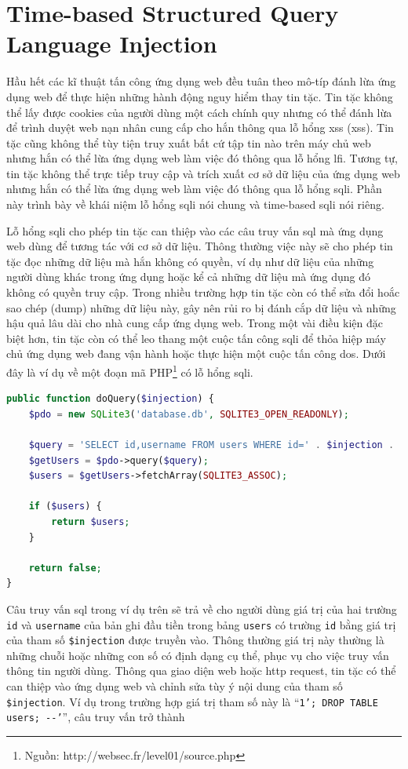 \section{Time-based Structured Query Language Injection}
Hầu hết các kĩ thuật tấn công ứng dụng web đều tuân theo mô-típ đánh lừa ứng dụng web để thực hiện những hành động nguy hiểm thay tin tặc. Tin tặc không thể lấy được cookies của người dùng một cách chính quy nhưng có thể đánh lừa để trình duyệt web nạn nhân cung cấp cho hắn thông qua lỗ hổng \acrlong{xss} (\acrshort{xss}). Tin tặc cũng không thể tùy tiện truy xuất bất cứ tập tin nào trên máy chủ web nhưng hắn có thể lừa ứng dụng web làm việc đó thông qua lỗ hổng \acrshort{lfi}. Tương tự, tin tặc không thể trực tiếp truy cập và trích xuất cơ sở dữ liệu của ứng dụng web nhưng hắn có thể lừa ứng dụng web làm việc đó thông qua lỗ hổng \acrfull{sqli}. Phần này trình bày về khái niệm lỗ hổng \acrshort{sqli} nói chung và time-based \acrshort{sqli} nói riêng.\par
Lỗ hổng \acrfull{sqli} \parencite{li2011survey,sullivan2011web} cho phép tin tặc can thiệp vào các câu truy vấn \acrshort{sql} mà ứng dụng web dùng để tương tác với cơ sở dữ liệu. Thông thường việc này sẽ cho phép tin tặc đọc những dữ liệu mà hắn không có quyền, ví dụ như dữ liệu của những người dùng khác trong ứng dụng hoặc kể cả những dữ liệu mà ứng dụng đó không có quyền truy cập. Trong nhiều trường hợp tin tặc còn có thể sửa đổi hoắc sao chép (dump) những dữ liệu này, gây nên rủi ro bị đánh cắp dữ liệu và những hậu quả lâu dài cho nhà cung cấp ứng dụng web. Trong một vài điều kiện đặc biệt hơn, tin tặc còn có thể leo thang một cuộc tấn công \acrshort{sqli} để thỏa hiệp máy chủ ứng dụng web đang vận hành hoặc thực hiện một cuộc tấn công \acrshort{dos}. Dưới đây là ví dụ về một đoạn mã PHP\footnote{Nguồn: http://websec.fr/level01/source.php} có lỗ hổng \acrshort{sqli}.
\begin{lstlisting}[language=php]
public function doQuery($injection) {
    $pdo = new SQLite3('database.db', SQLITE3_OPEN_READONLY);
    
    $query = 'SELECT id,username FROM users WHERE id=' . $injection . ' LIMIT 1';
    $getUsers = $pdo->query($query);
    $users = $getUsers->fetchArray(SQLITE3_ASSOC);

    if ($users) {
        return $users;
    }

    return false;
}
\end{lstlisting}
Câu truy vấn \acrshort{sql} trong ví dụ trên sẽ trả về cho người dùng giá trị của hai trường \texttt{id} và \texttt{username} của bản ghi đầu tiền trong bảng \texttt{users} có trường \texttt{id} bằng giá trị của tham số \texttt{\$injection} được truyền vào. Thông thường giá trị này thường là những chuỗi hoặc những con số có định dạng cụ thể, phục vụ cho việc truy vấn thông tin người dùng. Thông qua giao diện web hoặc \acrshort{http} request, tin tặc có thể can thiệp vào ứng dụng web và chỉnh sửa tùy ý nội dung của tham số \texttt{\$injection}. Ví dụ trong trường hợp giá trị tham số này là ``\colorbox{gray!30}{\texttt{1'; DROP TABLE users; -{}-'}}'', câu truy vấn trở thành\\
